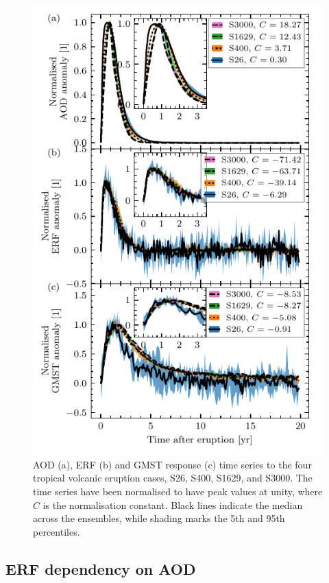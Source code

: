 \documentclass[draft]{agujournal2019}
\begin{document}
  \begin{figure}
    \centering \includegraphics{figure1}

    \caption{AOD (a), ERF (b) and GMST response (c) time series to the four tropical
      volcanic eruption cases, S26, S400, S1629, and S3000. The time series have been
      normalised to have peak values at unity, where \(C\) is the normalisation
      constant. Black lines indicate the median across the ensembles, while shading
      marks the 5th and 95th percentiles.}\label{fig:1_compare_waveform}%
  \end{figure}

  \subsection{ERF dependency on AOD}
\end{document}
